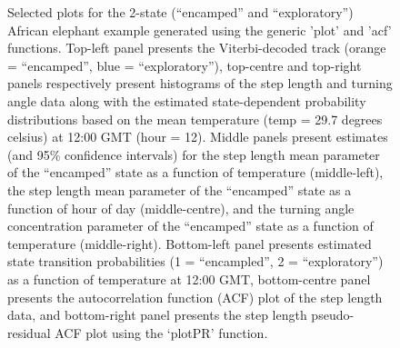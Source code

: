 \documentclass[12pt]{article}\usepackage[]{graphicx}\usepackage[]{color}
\begin{document}
\begin{figure}[htbp]
  \caption{Selected plots for the 2-state (``encamped'' and ``exploratory'') African elephant example generated using the generic 'plot' and 'acf' functions. Top-left panel presents the Viterbi-decoded track (orange = ``encamped'', blue = ``exploratory''), top-centre and top-right panels respectively present histograms of the step length and turning angle data along with the estimated state-dependent probability distributions based on the mean temperature (temp = 29.7 degrees celsius) at 12:00 GMT (hour = 12).  Middle panels present estimates (and 95\% confidence intervals) for the step length mean parameter of the ``encamped'' state as a function of temperature (middle-left), the step length mean parameter of the ``encamped'' state as a function of hour of day (middle-centre), and the turning angle concentration parameter of the ``encamped'' state as a function of temperature (middle-right).  Bottom-left panel presents estimated state transition probabilities (1 = ``encampled'', 2 = ``exploratory'') as a function of temperature at 12:00 GMT, bottom-centre panel presents the autocorrelation function (ACF) plot of the step length data, and bottom-right panel presents the step length pseudo-residual ACF plot using the `plotPR' function.}
  \label{fig:elephantResults}
\end{figure}
\end{document}
